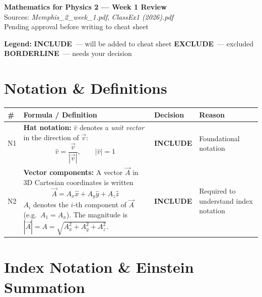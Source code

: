 \documentclass[11pt,a4paper]{article}
\newcommand{\inc}{\textbf{\textcolor{incgreen}{INCLUDE}}}
\newcommand{\exc}{\textbf{\textcolor{exred}{EXCLUDE}}}
\newcommand{\bord}{\textbf{\textcolor{borderorange}{BORDERLINE}}}
\begin{document}
\begin{center}
  {\LARGE \textbf{Mathematics for Physics 2 --- Week 1 Review}} \\[6pt]
  {\large Sources: \textit{Memphis\_2\_week\_1.pdf}, \textit{ClassEx1 (2026).pdf}} \\[4pt]
  {\normalsize Pending approval before writing to cheat sheet}
\end{center}

\vspace{1em}

\begin{mdframed}[backgroundcolor=gray!10]
\textbf{Legend:} \inc\ --- will be added to cheat sheet \quad
\exc\ --- excluded \quad \bord\ --- needs your decision
\end{mdframed}

\vspace{1em}

\section{Notation \& Definitions}

\begin{longtable}{p{0.5cm} p{7.5cm} p{2.2cm} p{3.5cm}}
\toprule
\# & Formula / Definition & Decision & Reason \\
\midrule
\endhead

N1 & \textbf{Hat notation:} $\hat{v}$ denotes a \emph{unit vector} in the direction of $\vec{v}$:
\[
  \hat{v} = \frac{\vec{v}}{|\vec{v}|}, \qquad |\hat{v}| = 1
\]
& \inc & Foundational notation \\[14pt]

N2 & \textbf{Vector components:} A vector $\vec{A}$ in 3D Cartesian coordinates is written
\[
  \vec{A} = A_x\hat{x} + A_y\hat{y} + A_z\hat{z}
\]
$A_i$ denotes the $i$-th component of $\vec{A}$ (e.g.\ $A_1 = A_x$). \newline
The magnitude is $|\vec{A}| = A = \sqrt{A_x^2 + A_y^2 + A_z^2}$.
& \inc & Required to understand index notation \\[14pt]

\bottomrule
\end{longtable}

\section{Index Notation \& Einstein Summation}
\end{document}
